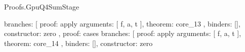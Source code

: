 \begin{lexlean}{Proofs.GpuQ4SumStage}
\begin{semanticmodule}
{{{{{{{{{{{{{{{{{{{{{{{{{{{{                                                                                  branches: [
                                                                                    {
                                                                                      proof: apply{
                                                                                        arguments: [
                                                                                          f,
                                                                                          a,
                                                                                          t
                                                                                        ],
                                                                                        theorem: core_13
                                                                                      },
                                                                                      binders: [],
                                                                                      constructor: zero
                                                                                    },
                                                                                    {
                                                                                      proof: cases{
                                                                                        branches: [
                                                                                          {
                                                                                            proof: apply{
                                                                                              arguments: [
                                                                                                f,
                                                                                                a,
                                                                                                t
                                                                                              ],
                                                                                              theorem: core_14
                                                                                            },
                                                                                            binders: [],
                                                                                            constructor: zero
}}}}}}}}}}}}}}}}}}}}}}}}}}}}}}}
\end{semanticmodule}
\end{lexlean}

